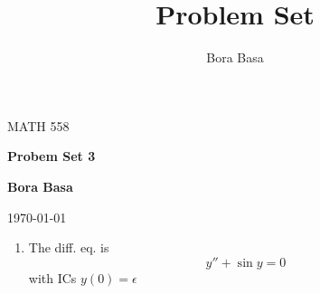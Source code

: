 \documentclass[12pt]{article}
\title{Problem Set \HWNO}
\author{Bora Basa}
\newcommand{\CLASS}{MATH 558}
\newcommand{\HWNO}{3}
\begin{document}
\begin{titlepage}
    \setlength{\parindent}{0pt}
    \vspace*{-3.8\baselineskip}
    \CLASS
    \begin{center}
    \vspace{.1\textheight}
    {\huge\bfseries Probem Set \HWNO \par}
    \bigbreak
    {\bfseries\large Bora Basa\par}
    \bigbreak
    \today
\end{center}
\end{titlepage}
\begin{enumerate}
    \item The diff. eq. is
    \begin{equation}
         y''+\sin y = 0
     \end{equation}
     with ICs $y(0)=\epsilon$
\end{enumerate}
\end{document}
